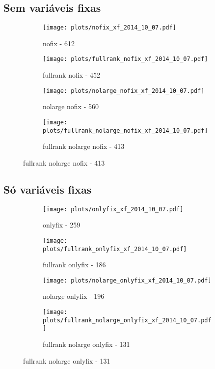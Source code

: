 \documentclass{article}
\begin{document}
\subsection{Sem variáveis fixas}

\begin{figure}[H]
  \centering
  \begin{subfigure}{0.48\textwidth}
    \texttt{[image: plots/nofix\_xf\_2014\_10\_07.pdf]}
    \caption{nofix - 612}
  \end{subfigure}
  \begin{subfigure}{0.48\textwidth}
    \texttt{[image: plots/fullrank\_nofix\_xf\_2014\_10\_07.pdf]}
    \caption{fullrank nofix - 452}
  \end{subfigure}
  \begin{subfigure}{0.48\textwidth}
    \texttt{[image: plots/nolarge\_nofix\_xf\_2014\_10\_07.pdf]}
    \caption{nolarge nofix - 560}
  \end{subfigure}
  \begin{subfigure}{0.48\textwidth}
    \texttt{[image: plots/fullrank\_nolarge\_nofix\_xf\_2014\_10\_07.pdf]}
    \caption{fullrank nolarge nofix - 413}
  \end{subfigure}
\end{figure}

\subsection{Só variáveis fixas}

\begin{figure}[H]
  \centering
  \begin{subfigure}{0.48\textwidth}
    \texttt{[image: plots/onlyfix\_xf\_2014\_10\_07.pdf]}
    \caption{onlyfix - 259}
  \end{subfigure}
  \begin{subfigure}{0.48\textwidth}
    \texttt{[image: plots/fullrank\_onlyfix\_xf\_2014\_10\_07.pdf]}
    \caption{fullrank onlyfix - 186}
  \end{subfigure}
  \begin{subfigure}{0.48\textwidth}
    \texttt{[image: plots/nolarge\_onlyfix\_xf\_2014\_10\_07.pdf]}
    \caption{nolarge onlyfix - 196}
  \end{subfigure}
  \begin{subfigure}{0.48\textwidth}
    \texttt{[image: plots/fullrank\_nolarge\_onlyfix\_xf\_2014\_10\_07.pdf]}
    \caption{fullrank nolarge onlyfix - 131}
  \end{subfigure}
\end{figure}
\end{document}
